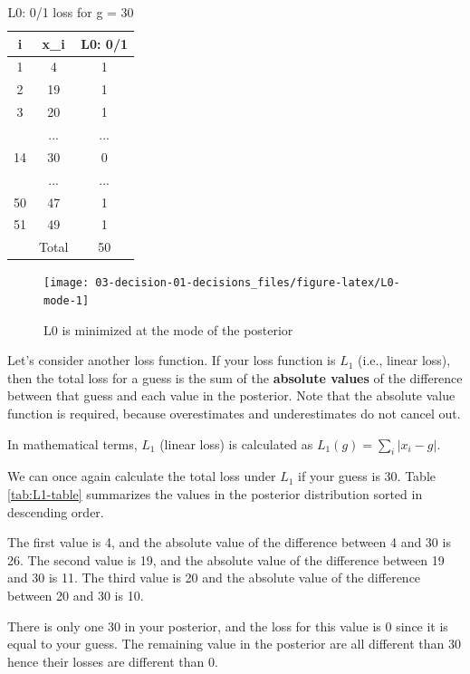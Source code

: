 \documentclass[]{book}
\theoremstyle{definition}
\theoremstyle{definition}
\theoremstyle{definition}
\theoremstyle{remark}
\begin{document}
\begin{table}

\caption{\label{tab:L0-table}L0: 0/1 loss for g = 30}
\centering
\begin{tabular}[t]{ccc}
\toprule
i & x\_i & L0: 0/1\\
\midrule
1 & 4 & 1\\
2 & 19 & 1\\
3 & 20 & 1\\
 & ... & ...\\
14 & 30 & 0\\
\addlinespace
 & ... & ...\\
50 & 47 & 1\\
51 & 49 & 1\\
 & Total & 50\\
\bottomrule
\end{tabular}
\end{table}

\begin{figure}

{\centering \texttt{[image: 03-decision-01-decisions\_files/figure-latex/L0-mode-1]} 

}

\caption{L0 is minimized at the mode of the posterior}\label{fig:L0-mode}
\end{figure}

Let's consider another loss function. If your loss function is \(L_1\)
(i.e., linear loss), then the total loss for a guess is the sum of the
\textbf{absolute values} of the difference between that guess and each
value in the posterior. Note that the absolute value function is
required, because overestimates and underestimates do not cancel out.

In mathematical terms, \(L_1\) (linear loss) is calculated as
\(L_1(g) = \sum_i |x_i - g|\).

We can once again calculate the total loss under \(L_1\) if your guess
is 30. Table \ref{tab:L1-table} summarizes the values in the posterior
distribution sorted in descending order.

The first value is 4, and the absolute value of the difference between 4
and 30 is 26. The second value is 19, and the absolute value of the
difference between 19 and 30 is 11. The third value is 20 and the
absolute value of the difference between 20 and 30 is 10.

There is only one 30 in your posterior, and the loss for this value is 0
since it is equal to your guess. The remaining value in the posterior
are all different than 30 hence their losses are different than 0.
\end{document}
